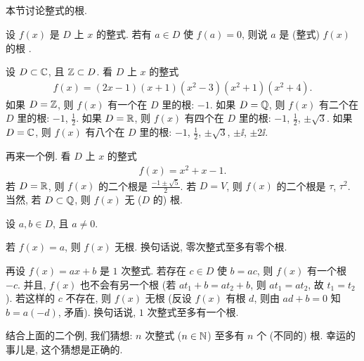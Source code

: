 \subsection*{\RootsOfPolynomials}
\markright{\RootsOfPolynomials}

本节讨论整式的根.

\begin{definition}
    设 $f(x)$ 是 $D$ 上 $x$ 的整式. 若有 $a \in D$ 使 $f(a) = 0$, 则说 $a$ 是 (整式) $f(x)$ 的根 .
\end{definition}

\begin{example}
    设 $D \subset \mathbb{C}$, 且 $\mathbb{Z} \subset D$. 看 $D$ 上 $x$ 的整式
    \begin{align*}
        f(x) = (2x-1)(x+1)(x^2 - 3)(x^2 + 1)(x^2 + 4).
    \end{align*}
    如果 $D = \mathbb{Z}$, 则 $f(x)$ 有一个在 $D$ 里的根: $-1$. 如果 $D = \mathbb{Q}$, 则 $f(x)$ 有二个在 $D$ 里的根: $-1$, $\frac12$. 如果 $D = \mathbb{R}$, 则 $f(x)$ 有四个在 $D$ 里的根: $-1$, $\frac12$, $\pm \sqrt{3}$. 如果 $D = \mathbb{C}$, 则 $f(x)$ 有八个在 $D$ 里的根: $-1$, $\frac12$, $\pm \sqrt{3}$, $\pm \ii$, $\pm 2\ii$.
\end{example}

\begin{example}
    再来一个例. 看 $D$ 上 $x$ 的整式
    \begin{align*}
        f(x) = x^2 + x - 1.
    \end{align*}
    若 $D = \mathbb{R}$, 则 $f(x)$ 的二个根是 $\frac{-1 \pm \sqrt{5}}{2}$. 若 $D = V$, 则 $f(x)$ 的二个根是 $\tau$, $\tau^2$. 当然, 若 $D \subset \mathbb{Q}$, 则 $f(x)$ 无 ($D$ 的) 根.
\end{example}

\begin{remark}
    设 $a,b \in D$, 且 $a \neq 0$.

    若 $f(x) = a$, 则 $f(x)$ 无根. 换句话说, 零次整式至多有零个根.

    再设 $f(x) = ax + b$ 是 $1$ 次整式. 若存在 $c \in D$ 使 $b = ac$, 则 $f(x)$ 有一个根 $-c$. 并且, $f(x)$ 也不会有另一个根 (若 $at_1 + b = at_2 + b$, 则 $at_1 = at_2$, 故 $t_1 = t_2$). 若这样的 $c$ 不存在, 则 $f(x)$ 无根 (反设 $f(x)$ 有根 $d$, 则由 $ad + b = 0$ 知 $b = a(-d)$, 矛盾). 换句话说, $1$ 次整式至多有一个根.

    结合上面的二个例, 我们猜想: $n$ 次整式 ($n \in \mathbb{N}$) 至多有 $n$ 个 (不同的) 根. 幸运的事儿是, 这个猜想是正确的.
\end{remark}

